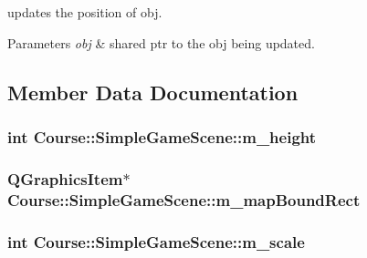 updates the position of obj. 


\begin{DoxyParams}{Parameters}
{\em obj} & shared ptr to the obj being updated. \\
\hline
\end{DoxyParams}


\subsection{Member Data Documentation}
\hypertarget{classCourse_1_1SimpleGameScene_ab9f181b61998050f4705136d4b8ac037}{
\subsubsection[{m\-\_\-height}]{\setlength{\rightskip}{0pt plus 5cm}int Course\-::\-Simple\-Game\-Scene\-::m\-\_\-height\hspace{0.3cm}{\ttfamily [private]}}}\label{classCourse_1_1SimpleGameScene_ab9f181b61998050f4705136d4b8ac037}
\hypertarget{classCourse_1_1SimpleGameScene_a0fb914c9a9a0b0f609a8e37122dfc66b}{
\subsubsection[{m\-\_\-map\-Bound\-Rect}]{\setlength{\rightskip}{0pt plus 5cm}Q\-Graphics\-Item$\ast$ Course\-::\-Simple\-Game\-Scene\-::m\-\_\-map\-Bound\-Rect\hspace{0.3cm}{\ttfamily [private]}}}\label{classCourse_1_1SimpleGameScene_a0fb914c9a9a0b0f609a8e37122dfc66b}
\hypertarget{classCourse_1_1SimpleGameScene_abcfe6adc631563891c7400147bb9de3f}{
\subsubsection[{m\-\_\-scale}]{\setlength{\rightskip}{0pt plus 5cm}int Course\-::\-Simple\-Game\-Scene\-::m\-\_\-scale\hspace{0.3cm}{\ttfamily [private]}}}\label{classCourse_1_1SimpleGameScene_abcfe6adc631563891c7400147bb9de3f}
